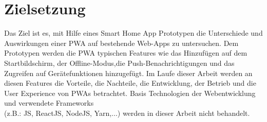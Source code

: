 \newpage
\section{Zielsetzung}\label{sub:Zielsetzung}
Das Ziel  ist es, mit Hilfe eines Smart Home App Prototypen die Unterschiede und Auswirkungen einer \acs{PWA} auf bestehende \acs{Web-App}s zu untersuchen.  
Dem Prototypen werden die \acs{PWA} typischen Features wie das Hinzufügen auf dem Startbildschirm, der Offline-Modus,die Push-Benachrichtigungen und 
das Zugreifen auf Gerätefunktionen hinzugefügt. 
Im Laufe dieser Arbeit werden an diesen Features die Vorteile, die Nachteile, die Entwicklung, der Betrieb und die User Experience von \acl{PWA}s betrachtet.
Basis Technologien der Webentwicklung und verwendete Frameworks  \\(z.B.: \acl{JS}, ReactJS, NodeJS, Yarn,...) werden in dieser Arbeit nicht behandelt.
